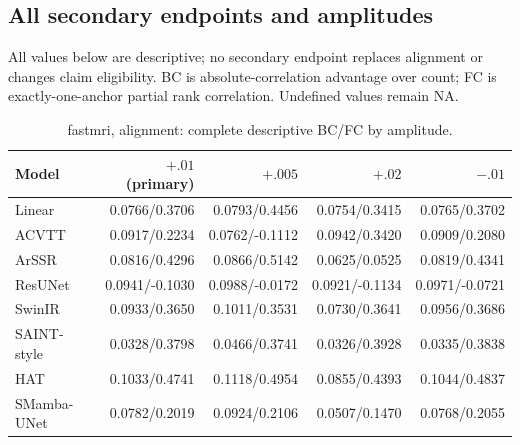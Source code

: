 \subsection{All secondary endpoints and amplitudes}

All values below are descriptive; no secondary endpoint replaces alignment or changes claim eligibility. BC is absolute-correlation advantage over count; FC is exactly-one-anchor partial rank correlation. Undefined values remain NA.

\begin{table}[t]\centering\scriptsize

\caption{fastmri, alignment: complete descriptive BC/FC by amplitude.}

\begin{tabular}{lrrrr}\toprule Model & $+.01$ (primary) & $+.005$ & $+.02$ & $-.01$\\\midrule

Linear & 0.0766/0.3706 & 0.0793/0.4456 & 0.0754/0.3415 & 0.0765/0.3702\\

ACVTT & 0.0917/0.2234 & 0.0762/-0.1112 & 0.0942/0.3420 & 0.0909/0.2080\\

ArSSR & 0.0816/0.4296 & 0.0866/0.5142 & 0.0625/0.0525 & 0.0819/0.4341\\

ResUNet & 0.0941/-0.1030 & 0.0988/-0.0172 & 0.0921/-0.1134 & 0.0971/-0.0721\\

SwinIR & 0.0933/0.3650 & 0.1011/0.3531 & 0.0730/0.3641 & 0.0956/0.3686\\

SAINT-style & 0.0328/0.3798 & 0.0466/0.3741 & 0.0326/0.3928 & 0.0335/0.3838\\

HAT & 0.1033/0.4741 & 0.1118/0.4954 & 0.0855/0.4393 & 0.1044/0.4837\\

SMamba-UNet & 0.0782/0.2019 & 0.0924/0.2106 & 0.0507/0.1470 & 0.0768/0.2055\\

\bottomrule\end{tabular}\end{table}

